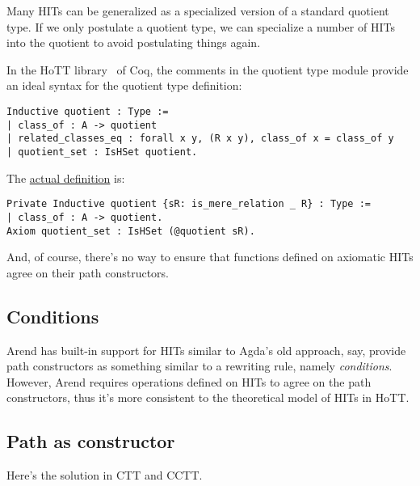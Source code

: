 Many HITs can be generalized as a specialized version of a standard
quotient type. If we only postulate a quotient type, we can specialize
a number of HITs into the quotient to avoid postulating things again.

In the HoTT library~\cite{HottCoq} of Coq, the comments in the quotient
type module provide an ideal syntax for the quotient type definition:

\begin{verbatim}
Inductive quotient : Type :=
| class_of : A -> quotient
| related_classes_eq : forall x y, (R x y), class_of x = class_of y
| quotient_set : IsHSet quotient.
\end{verbatim}

The \href{https://github.com/HoTT/HoTT/blob/b20bb573739284349a968bb219405255c744049d/theories/HIT/quotient.v#L40-L42}
{actual definition} is:

\begin{verbatim}
Private Inductive quotient {sR: is_mere_relation _ R} : Type :=
| class_of : A -> quotient.
Axiom quotient_set : IsHSet (@quotient sR).
\end{verbatim}

And, of course, there's no way to ensure that functions defined on
axiomatic HITs agree on their path constructors.



\subsection{Conditions}

Arend has built-in support for HITs
similar to Agda's old approach, say, provide
path constructors as something similar to a rewriting rule, namely \textit{conditions}.
However, Arend requires operations defined on HITs to agree on the path constructors,
thus it's more consistent to the theoretical model of HITs in HoTT.

\TODO

\subsection{Path as constructor}

Here's the solution in CTT and CCTT.

\TODO